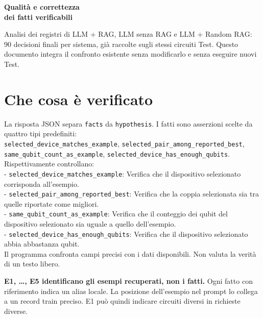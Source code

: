 \documentclass[a4paper,10pt]{article}
\begin{document}
{\LARGE\bfseries Qualità e correttezza\\dei fatti verificabili}\par
Analisi dei registri di LLM + RAG, LLM senza RAG e LLM + Random RAG: 90 decisioni finali per sistema, già raccolte sugli stessi circuiti Test.
Questo documento integra il confronto esistente senza modificarlo e senza eseguire nuovi Test.
\section*{Che cosa è verificato}
La risposta JSON separa \texttt{facts} da \texttt{hypothesis}. I fatti sono asserzioni scelte da quattro
tipi predefiniti:\\ \texttt{selected\_device\_matches\_example}, \texttt{selected\_pair\_among\_reported\_best}, \texttt{same\_qubit\_count\_as\_example}, \texttt{selected\_device\_has\_enough\_qubits}.\\
Rispettivamente controllano:\\
- \texttt{selected\_device\_matches\_example}: Verifica che il dispositivo selezionato corrisponda all'esempio.\\
- \texttt{selected\_pair\_among\_reported\_best}: Verifica che la coppia selezionata sia tra quelle riportate come migliori.\\
- \texttt{same\_qubit\_count\_as\_example}: Verifica che il conteggio dei qubit del dispositivo selezionato sia uguale a quello dell'esempio.\\
- \texttt{selected\_device\_has\_enough\_qubits}: Verifica che il dispositivo selezionato abbia abbastanza qubit.\\

Il programma confronta campi precisi con i dati disponibili. Non valuta la verità di un testo libero.

\textbf{E1, \ldots, E5 identificano gli esempi recuperati, non i fatti.}
Ogni fatto con riferimento indica un alias locale. La posizione dell'esempio nel prompt lo collega
a un record train preciso. E1 può quindi indicare circuiti diversi in richieste diverse.
\begin{center}
\end{center}
\end{document}
